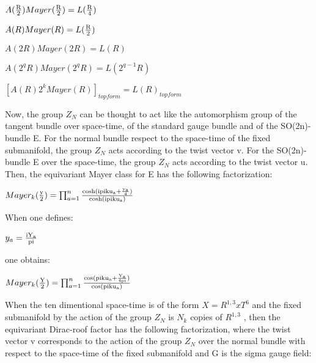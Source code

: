 \documentclass[a4paper,a4paper]{article}
\begin{document}
\begin{center}
 
{  $A(\frac{\rm R}{\rm 2})Mayer(\frac{\rm R}{\rm 2}) 
 = L(\frac{\rm R}{\rm 4})$}
\end{center} 
\begin{center}
 
{  $A(R)Mayer(R) 
 = L(\frac{\rm R}{\rm 2})$}
\end{center} 
\begin{center}
 
{  $A(2R)Mayer(2R) 
 = L(R)$}
\end{center}
\begin{center}
{  $A(2^qR)Mayer(2^qR) 
 = L(2^{q-1}R)$}
\end{center} 
\begin{center}
 
{  $[A(R)2^kMayer(R)]_{top form} 
 = L(R)_{top form}$}
\end{center}

Now, the group $Z_N$ can be thought to act like the automorphism group of the tangent bundle over space-time, of the standard gauge bundle and of the
SO(2n)-bundle E. For the normal bundle respect to the space-time of the fixed submanifold, the group $Z_N$ acts according to the twist vector v. For the SO(2n)-bundle E over the space-time,  the group $Z_N$ acts according to the twist vector u. Then, the equivariant Mayer class for E has the following factorization:

\begin{center}
{  $ Mayer_k(\frac{\rm y}{\rm 2}) = \prod_{a=1}^n\frac{\rm cosh(ipiku_a+\frac{\rm y_a}{\rm 4})}{\rm cosh(ipiku_a)}$ }
\end{center}

When one defines:

\begin{center}
{  $ y_a = \frac{\rm iY_a}{\rm pi }$ }
\end{center}

one obtains:

\begin{center}
{  $ Mayer_k(\frac{\rm Y}{\rm 2}) = \prod_{a=1}^n\frac{\rm cos(piku_a+\frac{\rm Y_a}{\rm 4pi})}{\rm cos(piku_a)}$ }
\end{center}

When the ten dimentional space-time is of the form $X=R^{1,3}x T^6$ and the fixed submanifold by the action of the group $Z_N$ is $N_k$ copies of $R^{1,3}$   , then the equivariant Dirac-roof factor has the following factorization, where the twist vector v corresponds to the action of the group $Z_N$ over the normal bundle with respect to the space-time of the fixed submanifold and G is the sigma gauge field:
\end{document}
